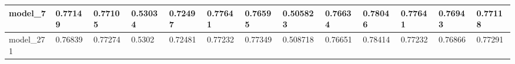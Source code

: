 \begin{tabular}{|l|l|l|l|l|l|l|l|l|l|l|l|l|}
model\_7       & 0.77149     & 0.77105        & 0.53034      & 0.72497          & 0.77641              & 0.76595              & 0.505823     & 0.76634           & 0.78046            & 0.77641         & 0.76943     & 0.77118      \\ \hline
model\_271     & 0.76839     & 0.77274        & 0.5302       & 0.72481          & 0.77232              & 0.77349              & 0.508718     & 0.76651           & 0.78414            & 0.77232         & 0.76866     & 0.77291      \\ \hline
\end{tabular}